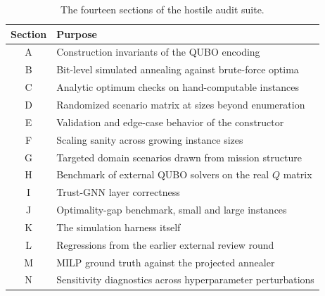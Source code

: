 \begin{table}[t]
  \centering
  \caption{The fourteen sections of the hostile audit suite.}
  \label{tab:auditsections}
  \begin{tabular}{cl}
    \toprule
    Section & Purpose \\
    \midrule
    A & Construction invariants of the QUBO encoding \\
    B & Bit-level simulated annealing against brute-force optima \\
    C & Analytic optimum checks on hand-computable instances \\
    D & Randomized scenario matrix at sizes beyond enumeration \\
    E & Validation and edge-case behavior of the constructor \\
    F & Scaling sanity across growing instance sizes \\
    G & Targeted domain scenarios drawn from mission structure \\
    H & Benchmark of external QUBO solvers on the real $Q$ matrix \\
    I & Trust-GNN layer correctness \\
    J & Optimality-gap benchmark, small and large instances \\
    K & The simulation harness itself \\
    L & Regressions from the earlier external review round \\
    M & MILP ground truth against the projected annealer \\
    N & Sensitivity diagnostics across hyperparameter perturbations \\
    \bottomrule
  \end{tabular}
\end{table}

